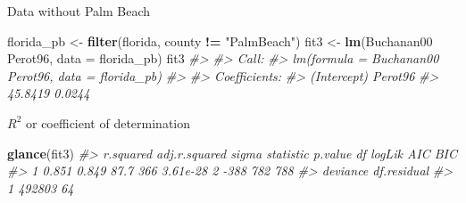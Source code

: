 \documentclass[]{book}
\newenvironment{Shaded}{\begin{snugshade}}{\end{snugshade}}
\newcommand{\CommentTok}[1]{\textcolor[rgb]{0.56,0.35,0.01}{\textit{#1}}}
\newcommand{\DataTypeTok}[1]{\textcolor[rgb]{0.13,0.29,0.53}{#1}}
\newcommand{\DecValTok}[1]{\textcolor[rgb]{0.00,0.00,0.81}{#1}}
\newcommand{\KeywordTok}[1]{\textcolor[rgb]{0.13,0.29,0.53}{\textbf{#1}}}
\newcommand{\NormalTok}[1]{#1}
\newcommand{\OperatorTok}[1]{\textcolor[rgb]{0.81,0.36,0.00}{\textbf{#1}}}
\newcommand{\StringTok}[1]{\textcolor[rgb]{0.31,0.60,0.02}{#1}}
\theoremstyle{definition}
\theoremstyle{definition}
\theoremstyle{definition}
\theoremstyle{remark}
\begin{document}
Data without Palm Beach

\begin{Shaded}
\begin{Highlighting}[]
\NormalTok{florida_pb <-}\StringTok{ }\KeywordTok{filter}\NormalTok{(florida, county }\OperatorTok{!=}\StringTok{ "PalmBeach"}\NormalTok{)}
\NormalTok{fit3 <-}\StringTok{ }\KeywordTok{lm}\NormalTok{(Buchanan00 }\OperatorTok{~}\StringTok{ }\NormalTok{Perot96, }\DataTypeTok{data =}\NormalTok{ florida_pb)}
\NormalTok{fit3}
\CommentTok{#> }
\CommentTok{#> Call:}
\CommentTok{#> lm(formula = Buchanan00 ~ Perot96, data = florida_pb)}
\CommentTok{#> }
\CommentTok{#> Coefficients:}
\CommentTok{#> (Intercept)      Perot96  }
\CommentTok{#>     45.8419       0.0244}
\end{Highlighting}
\end{Shaded}

\(R^2\) or coefficient of determination

\begin{Shaded}
\begin{Highlighting}[]
\KeywordTok{glance}\NormalTok{(fit3)}
\CommentTok{#>   r.squared adj.r.squared sigma statistic  p.value df logLik AIC BIC}
\CommentTok{#> 1     0.851         0.849  87.7       366 3.61e-28  2   -388 782 788}
\CommentTok{#>   deviance df.residual}
\CommentTok{#> 1   492803          64}
\end{Highlighting}
\end{Shaded}

\begin{Shaded}
\end{Shaded}
\end{document}
